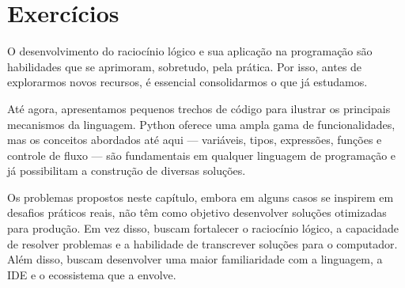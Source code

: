 \chapter{Exercícios}\label{ex}

O desenvolvimento do raciocínio lógico e sua aplicação na programação são habilidades que se aprimoram, sobretudo, pela
prática.
Por isso, antes de explorarmos novos recursos, é essencial consolidarmos o que já estudamos.

Até agora, apresentamos pequenos trechos de código para ilustrar os principais mecanismos da linguagem.
Python oferece uma ampla gama de funcionalidades, mas os conceitos abordados até aqui --- variáveis, tipos, expressões,
funções e controle de fluxo --- são fundamentais em qualquer linguagem de programação e já possibilitam a construção de
diversas soluções.

Os problemas propostos neste capítulo, embora em alguns casos se inspirem em desafios práticos reais, não têm como
objetivo desenvolver soluções otimizadas para produção.
Em vez disso, buscam fortalecer o raciocínio lógico, a capacidade de resolver problemas e a habilidade de transcrever
soluções para o computador.
Além disso, buscam desenvolver uma maior familiaridade com a linguagem, a IDE e o ecossistema que a envolve.

